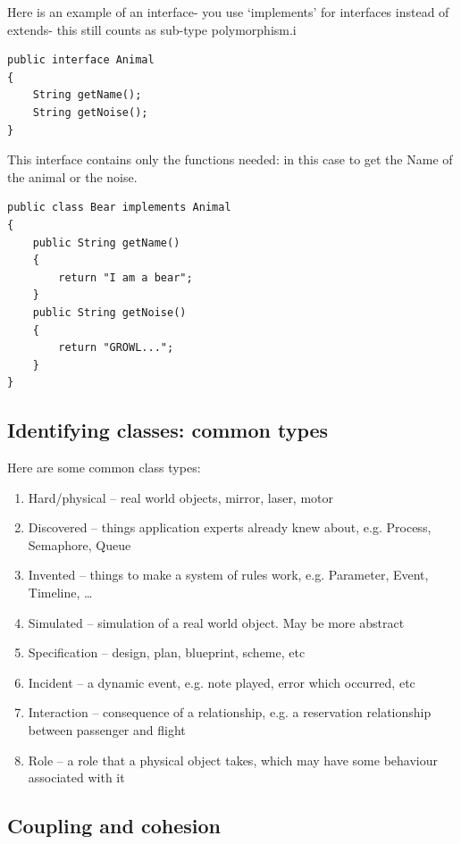 \documentclass{article}
\begin{document}
Here is an example of an interface- you use `implements' for interfaces instead of extends- this still
counts as sub-type polymorphism.i

\begin{lstlisting}
public interface Animal
{
	String getName();
	String getNoise();
}
\end{lstlisting}
This interface contains only the functions needed: in this case to get the Name of the animal or the noise.

\begin{lstlisting}
public class Bear implements Animal
{
	public String getName()
	{
		return "I am a bear";
	}
	public String getNoise()
	{
		return "GROWL...";
	}
}
\end{lstlisting}

\subsection{Identifying classes: common types}

Here are some common class types:

\begin{enumerate}
\item Hard/physical – real world objects, mirror, laser, motor
\item Discovered – things application experts already knew about, e.g.
Process, Semaphore, Queue
\item Invented – things to make a system of rules work, e.g. Parameter,
Event, Timeline, …
\item Simulated – simulation of a real world object. May be more abstract
\item Specification – design, plan, blueprint, scheme, etc
\item Incident – a dynamic event, e.g. note played, error which occurred, etc
\item Interaction – consequence of a relationship, e.g. a reservation
relationship between passenger and flight
\item Role – a role that a physical object takes, which may have some
behaviour associated with it
\end{enumerate}

\subsection{Coupling and cohesion}
\end{document}
